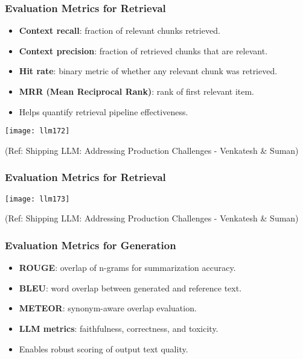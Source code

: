\begin{frame}[fragile]\frametitle{Evaluation Metrics for Retrieval}
  \begin{itemize}
    \item \textbf{Context recall}: fraction of relevant chunks retrieved.
    \item \textbf{Context precision}: fraction of retrieved chunks that are relevant.
    \item \textbf{Hit rate}: binary metric of whether any relevant chunk was retrieved.
    \item \textbf{MRR (Mean Reciprocal Rank)}: rank of first relevant item.
    \item Helps quantify retrieval pipeline effectiveness.
  \end{itemize}

	\begin{center}
	\texttt{[image: llm172]}
	
	{\tiny (Ref: Shipping LLM: Addressing Production Challenges - Venkatesh \& Suman)}
	\end{center}   
\end{frame}

\begin{frame}[fragile]\frametitle{Evaluation Metrics for Retrieval}

	\begin{center}
	\texttt{[image: llm173]}
	
	{\tiny (Ref: Shipping LLM: Addressing Production Challenges - Venkatesh \& Suman)}
	\end{center}   
\end{frame}


\begin{frame}[fragile]\frametitle{Evaluation Metrics for Generation}
  \begin{itemize}
    \item \textbf{ROUGE}: overlap of n-grams for summarization accuracy.
    \item \textbf{BLEU}: word overlap between generated and reference text.
    \item \textbf{METEOR}: synonym-aware overlap evaluation.
    \item \textbf{LLM metrics}: faithfulness, correctness, and toxicity.
    \item Enables robust scoring of output text quality.
  \end{itemize}
\end{frame}

